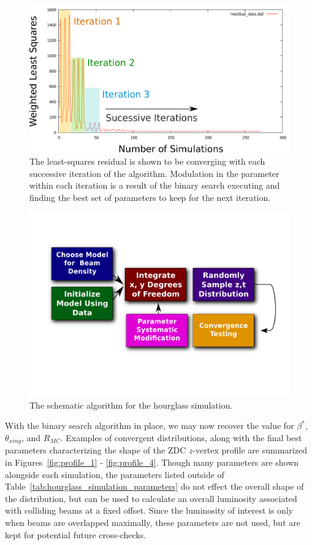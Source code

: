 \begin{figure}[h]
  \centering
  \includegraphics[width=0.8\linewidth]{./figures/vernier_root_finding.png}
  \caption{
    The least-squares residual is shown to be converging with each
    successive iteration of the algorithm. Modulation in the parameter within
    each iteration is a result of the binary search executing and finding the
    best set of parameters to keep for the next iteration.
  }
  \label{fig:least_squares_convergence}
\end{figure}


\begin{figure}[h]
  \centering
  \includegraphics[width=0.8\linewidth]{./figures/simulation_flow.pdf}
  \caption{The schematic algorithm for the hourglass simulation.}
  \label{fig:simulation_flow}
\end{figure}

With the binary search algorithm in place, we may now recover the value for
$\beta^*$, $\theta_{xing}$, and $R_{MC}$. Examples of convergent distributions,
along with the final best parameters characterizing the shape of the ZDC
$z$-vertex profile are summarized in Figures~\ref{fig:profile_1} -
\ref{fig:profile_4}. Though many parameters are shown alongside each simulation,
the parameters listed outside of Table~\ref{tab:hourglass_simulation_parameters}
do not effect the overall shape of the distribution, but can be used to
calculate an overall luminosity associated with colliding beams at a fixed
offset. Since the luminosity of interest is only when beams are overlapped
maximally, these parameters are not used, but are kept for potential future
cross-checks.

